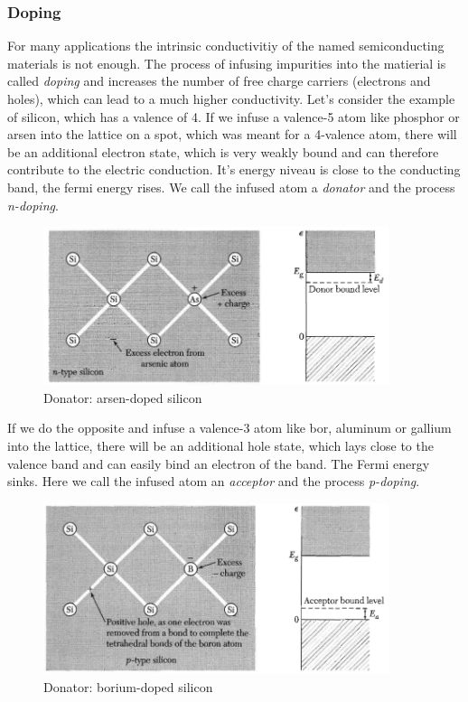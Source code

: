 \documentclass[11pt]{article}
\begin{document}
\subsubsection{Doping}
For many applications the intrinsic conductivitiy of the named semiconducting materials is not enough. The process of infusing impurities into the matierial is called \textit{doping} and increases the number of free charge carriers (electrons and holes), which can lead to a much higher conductivity. Let's consider the example of silicon, which has a valence of 4. If we infuse a valence-5 atom like phosphor or arsen into the lattice on a spot, which was meant for a 4-valence atom, there will be an additional electron state, which is very weakly bound and can therefore contribute to the electric conduction. It's energy niveau is close to the conducting band, the fermi energy rises. We call the infused atom a \textit{donator} and the process \textit{n-doping}. 
\begin{figure}[H]
\centering
\includegraphics[width=0.9\textwidth]{donator}%
\caption{Donator: arsen-doped silicon}
\label{fig:donator}
\end{figure}

\noindent
If we do the opposite and infuse a valence-3 atom like bor, aluminum or gallium into the lattice, there will be an additional hole state, which lays close to the valence band and can easily bind an electron of the band. The Fermi energy sinks. Here we call the infused atom an \textit{acceptor} and the process \textit{p-doping}.   
\begin{figure}[H]
\centering
\includegraphics[width=0.9\textwidth]{acceptor}%
\caption{Donator: borium-doped silicon}
\label{fig:acceptor}
\end{figure}
\end{document}
